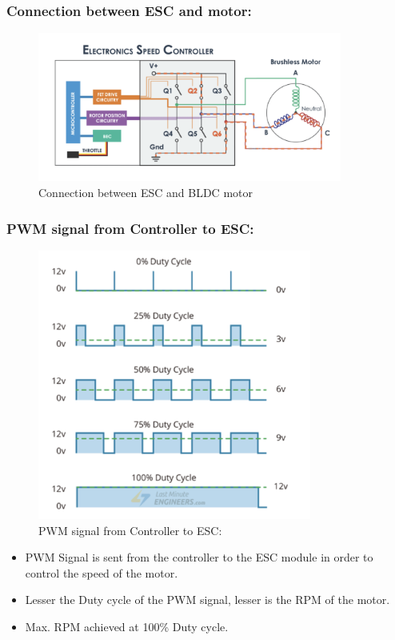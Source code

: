 \newpage
\subsubsection{Connection between ESC and motor:}
\begin{figure}[h!]
\centering
\includegraphics[width=10cm]{./Figures/conn_esc_with_motor_qc.png}
\caption{Connection between ESC and BLDC motor}
\label{conn_esc_with_motor_qc}
\end{figure}

\subsubsection{PWM signal from Controller to ESC:}
\begin{figure}[h!]
\centering
\includegraphics[width=9cm]{./Figures/signal_from_controller2esc_qc.png}
\caption{PWM signal from Controller to ESC:}
\label{signal_from_controller2esc_qc}
\end{figure}

\begin{itemize}
    \item PWM Signal is sent from the controller to the ESC module in order to control the speed of the motor.
    \item Lesser the Duty cycle of the PWM signal, lesser is the RPM of the motor.
    \item Max. RPM achieved at 100\% Duty cycle. 
\end{itemize}


